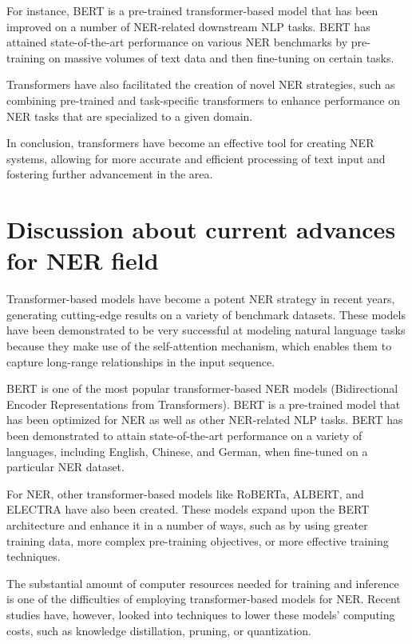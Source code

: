 \documentclass[a4paper,12pt]{report}
\begin{document}
\par
For instance, BERT is a pre-trained transformer-based model that has been improved on a number of NER-related downstream NLP tasks. BERT has attained state-of-the-art performance on various NER benchmarks by pre-training on massive volumes of text data and then fine-tuning on certain tasks.
\par
Transformers have also facilitated the creation of novel NER strategies, such as combining pre-trained and task-specific transformers to enhance performance on NER tasks that are specialized to a given domain.
\par
In conclusion, transformers have become an effective tool for creating NER systems, allowing for more accurate and efficient processing of text input and fostering further advancement in the area.
\section{Discussion about current advances for NER field}
Transformer-based models have become a potent NER strategy in recent years, generating cutting-edge results on a variety of benchmark datasets. These models have been demonstrated to be very successful at modeling natural language tasks because they make use of the self-attention mechanism, which enables them to capture long-range relationships in the input sequence.
\par
BERT is one of the most popular transformer-based NER models (Bidirectional Encoder Representations from Transformers). BERT is a pre-trained model that has been optimized for NER as well as other NER-related NLP tasks. BERT has been demonstrated to attain state-of-the-art performance on a variety of languages, including English, Chinese, and German, when fine-tuned on a particular NER dataset.
\par
For NER, other transformer-based models like RoBERTa, ALBERT, and ELECTRA have also been created. These models expand upon the BERT architecture and enhance it in a number of ways, such as by using greater training data, more complex pre-training objectives, or more effective training techniques.
\par
The substantial amount of computer resources needed for training and inference is one of the difficulties of employing transformer-based models for NER. Recent studies have, however, looked into techniques to lower these models' computing costs, such as knowledge distillation, pruning, or quantization.
\par
\end{document}
